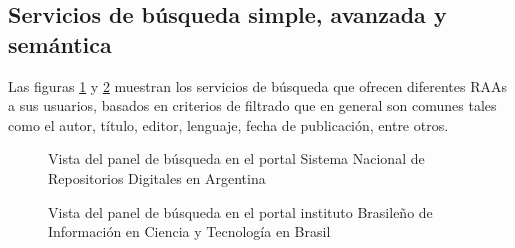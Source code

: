 \subsection{Servicios de b\'usqueda simple, avanzada y sem\'antica}

Las figuras \ref{busquedas-snrd-1} y \ref{busquedas-snrd-2} muestran los servicios de b\'usqueda que ofrecen diferentes RAAs a sus usuarios, basados en criterios de filtrado que en general son comunes tales como el autor, t\'itulo, editor, lenguaje, fecha de publicaci\'on, entre otros.\newline

\begin{figure}[!ht]
    \centering
    \caption{Vista del panel de b\'usqueda en el portal Sistema Nacional de Repositorios Digitales en Argentina} %
    \label{busquedas-snrd-1}
\end{figure}

\begin{figure}[!ht]
    \centering
    \caption{Vista del panel de b\'usqueda en el portal instituto Brasile\~{n}o de Informaci\'on en Ciencia y Tecnolog\'ia en Brasil} %
    \label{busquedas-snrd-2}
\end{figure}

